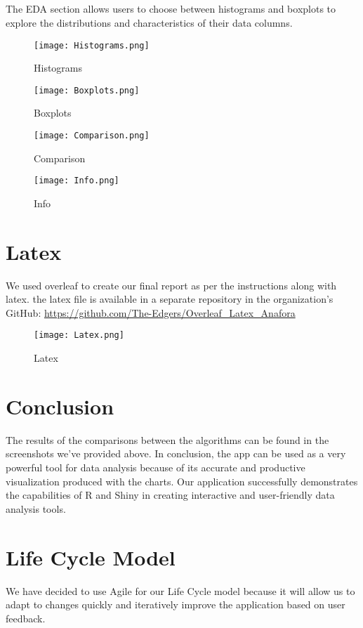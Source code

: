 \documentclass{article}
\begin{document}
\subsection{}The EDA section allows users to choose between histograms and boxplots to explore the distributions and characteristics of their data columns.
\begin{figure}[H]
    \centering
    \texttt{[image: Histograms.png]}
    \caption{Histograms}
\end{figure}
\begin{figure}[H]
    \centering
    \texttt{[image: Boxplots.png]}
    \caption{Boxplots}
\end{figure}
\begin{figure}[H]
    \centering
    \texttt{[image: Comparison.png]}
    \caption{Comparison}
\end{figure}
\begin{figure}[H]
    \centering
    \texttt{[image: Info.png]}
    \caption{Info}
\end{figure}

\section{Latex}We used overleaf to create our final report as per the instructions along with latex. the latex file is available in a separate repository in the organization's GitHub:
\url{https://github.com/The-Edgers/Overleaf_Latex_Anafora}
\begin{figure}[H]
    \centering
    \texttt{[image: Latex.png]}
    \caption{Latex}
\end{figure}

\section{Conclusion}The results of the comparisons between the algorithms can be found in the screenshots we've provided above.
In conclusion, the app can be used as a very powerful tool for data analysis because of its accurate and productive visualization produced with the charts.  Our application successfully demonstrates the capabilities of R and Shiny in creating interactive and user-friendly data analysis tools.

\section{Life Cycle Model}
We have decided to use Agile for our Life Cycle model because it will allow us to adapt to changes quickly and iteratively improve the application based on user feedback.
\end{document}
